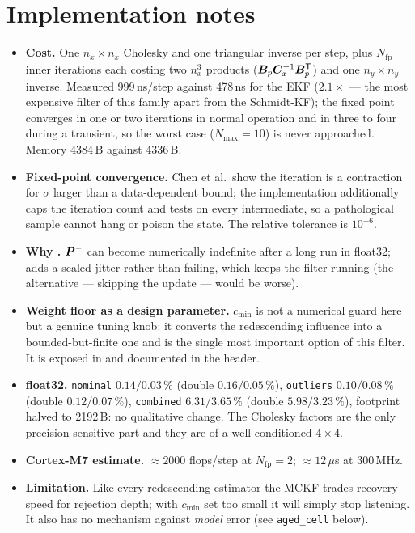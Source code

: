 \section{Implementation notes}
\begin{itemize}[nosep]
\item \textbf{Cost.}  One $n_x\times n_x$ Cholesky and one triangular inverse per step, plus
$N_{\mathrm{fp}}$ inner iterations each costing two $n_x^3$ products
($\bm{B}_p\bm{C}_x^{-1}\bm{B}_p^{\mathsf{T}}$) and one $n_y\times n_y$ inverse.  Measured 999\,ns/step against
478\,ns for the EKF ($2.1\times$ --- the most expensive filter of this family apart from the
Schmidt-KF); the fixed point converges in one or two iterations in
normal operation and in three to four during a transient, so the worst case
($N_{\max}=10$) is never approached.  Memory 4384\,B against 4336\,B.
\item \textbf{Fixed-point convergence.}  Chen et al.\ show the iteration is a contraction for
$\sigma$ larger than a data-dependent bound; the implementation additionally caps the iteration
count and tests  on every intermediate, so a pathological sample cannot hang or
poison the state.  The relative tolerance is $10^{-6}$.
\item \textbf{Why .}  $\bm{P}^{-}$ can become numerically indefinite after a long
run in float32;  adds a scaled jitter rather than failing, which keeps the
filter running (the alternative --- skipping the update --- would be worse).
\item \textbf{Weight floor as a design parameter.}  $c_{\min}$ is not a numerical guard here but a
genuine tuning knob: it converts the redescending influence into a bounded-but-finite one and is
the single most important option of this filter.  It is exposed in  and documented
in the header.
\item \textbf{float32.}  \texttt{nominal} $0.14/0.03\,\%$ (double $0.16/0.05\,\%$),
\texttt{outliers} $0.10/0.08\,\%$ (double $0.12/0.07\,\%$), \texttt{combined} $6.31/3.65\,\%$
(double $5.98/3.23\,\%$), footprint halved to 2192\,B: no qualitative change.  The Cholesky
factors are the only precision-sensitive part and they are of a well-conditioned $4\times4$.
\item \textbf{Cortex-M7 estimate.}  $\approx2000$ flops/step at $N_{\mathrm{fp}}=2$;
$\approx12\,\mu$s at 300\,MHz.
\item \textbf{Limitation.}  Like every redescending estimator the MCKF trades recovery speed for
rejection depth; with $c_{\min}$ set too small it will simply stop listening.  It also has no
mechanism against \emph{model} error (see \texttt{aged\_cell} below).
\end{itemize}


